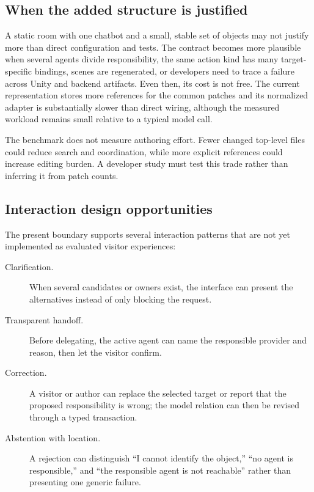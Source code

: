 \subsection{When the added structure is justified}

A static room with one chatbot and a small, stable set of objects may not
justify more than direct configuration and tests.  The contract becomes more
plausible when several agents divide responsibility, the same action kind has
many target-specific bindings, scenes are regenerated, or developers need to
trace a failure across Unity and backend artifacts.  Even then, its cost is not
free.  The current representation stores more references for the common
patches and its normalized adapter is substantially slower than direct wiring,
although the measured workload remains small relative to a typical model call.

The benchmark does not measure authoring effort.  Fewer changed top-level files
could reduce search and coordination, while more explicit references could
increase editing burden.  A developer study must test this trade rather than
inferring it from patch counts.

\subsection{Interaction design opportunities}

The present boundary supports several interaction patterns that are not yet
implemented as evaluated visitor experiences:

\begin{description}
  \item[Clarification.] When several candidates or owners exist, the interface
  can present the alternatives instead of only blocking the request.
  \item[Transparent handoff.] Before delegating, the active agent can name the
  responsible provider and reason, then let the visitor confirm.
  \item[Correction.] A visitor or author can replace the selected target or
  report that the proposed responsibility is wrong; the model relation can then
  be revised through a typed transaction.
  \item[Abstention with location.] A rejection can distinguish ``I cannot
  identify the object,'' ``no agent is responsible,'' and ``the responsible
  agent is not reachable'' rather than presenting one generic failure.
\end{description}

